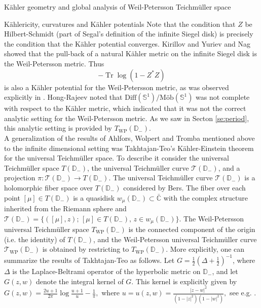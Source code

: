 \documentclass[12pt]{amsart}
\newcommand{\disk}{\ensuremath{\mathbb{D}} } %
\newcommand{\sphere}{\bar{\Bbb{C}}} %
\renewcommand{\Bbb}[1]{\ensuremath{\mathbb{#1}}}
\theoremstyle{plain}
\theoremstyle{definition}
\theoremstyle{remark}
\numberwithin{equation}{section} %
\numberwithin{figure}{section} %
\begin{document}
\begin{section}{K\"ahler geometry and global analysis of Weil-Petersson Teichm\"uller space}
\begin{subsection}{K\"ahlericity, curvatures and K\"ahler potentials}
{Note that the condition that $Z$ be Hilbert-Schmidt (part of Segal's definition of the infinite Siegel disk) is precisely the condition that the K\"ahler potential converges.  
 Kirillov and Yuriev \cite{KY2}
  and Nag \cite{Nag_bulletin} showed that the pull-back
 of a natural K\"ahler metric on the infinite Siegel disk is the Weil-Petersson metric. 
 Thus 
 \begin{equation} \label{eq:period_kahler_potential_WP}
 -\operatorname{Tr} \log \left(1-Z^{\ast} Z\right)
 \end{equation}
 is also a K\"ahler potential
 for the Weil-Petersson metric, as was observed explicitly in \cite{KY2,HongRajeev}.  Hong-Rajeev
 noted that $\text{Diff}(\mathbb{S}^1)/\text{M\"ob}(\mathbb{S}^1)$ was not complete with
 respect to the K\"ahler metric, which indicated that it was not the correct analytic setting
 for the Weil-Petersson metric. As we saw in Secton \ref{se:period}, this analytic setting is provided by $T_{\mathrm{WP}}(\disk_-)$.} 
 \\

{A generalization of the results of Ahlfors, Wolpert and Tromba mentioned above to the infinite dimensional setting was Takhtajan-Teo's K\"ahler-Einstein theorem for the universal Teichm\"uller space. To describe it consider the universal Teichm\"uller space $T(\disk_-)$, the universal Teichm\"uller curve $\mathscr{T}(\disk_-)$, and a projection $\pi:\mathscr{T}(\disk_-)\to T(\disk_-).$ The universal Teichm\"uller curve $\mathscr{T}(\disk_-)$ is a holomorphic fiber space over $T(\disk_-)$ considered by Bers.  The fiber over each point $[\mu]\in T(\disk_-)$ is a quasidisk $w_{\mu} (\mathbb{D}_{-})\subset \sphere$ with the complex structure inherited from the Riemann sphere and $\mathscr{T}(\disk_-)=\{([\mu], z);\,[\mu]\in T(\disk_-),\, z\in w_{\mu} (\mathbb{D}_{-}) \}.$ The Weil-Petersson universal Teichm\"uller space ${T}_{\mathrm{WP}}(\disk_-)$ is the connected component of the origin (i.e. the identity) of \(T(\disk_-)\), and the Weil-Petersson universal Teichm\"uller curve $\mathscr{T}_{\mathrm{WP}}(\disk_-)$ is obtained by restricting to $T_{\mathrm{WP}}(\disk_-)$. 
 More explicitly, one can summarize the results of Takhtajan-Teo as follows.
Let \(G=\frac{1}{2}\left(\Delta+\frac{1}{2}\right)^{-1}\), where $\Delta$ is the Laplace-Beltrami operator of the hyperbolic metric on \(\mathbb{D}_{-}\), and let $G(z, w)$ denote the integral kernel of $G$.
This kernel is explicitly given by
\(G(z, w)=\frac{2 u+1}{2 \pi} \log \frac{u+1}{u}-\frac{1}{\pi},\) where \(u=u(z, w)=\frac{|z-w|^{2}}{\left(1-|z|^{2}\right)\left(1-|w|^{2}\right)},\) see e.g. \cite{Hejhal}.\\

}
\end{subsection}
\end{section}
\end{document}
